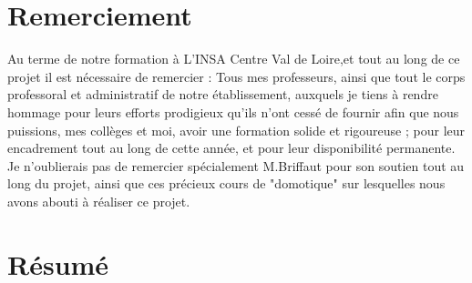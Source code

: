 \newpage
\section*{Remerciement}
Au terme de notre formation à L’INSA Centre Val de Loire,et tout au long de ce projet il est nécessaire de remercier :\newline
Tous mes professeurs, ainsi que tout le corps professoral et administratif de notre établissement, auxquels je tiens à rendre hommage pour leurs efforts prodigieux qu’ils n’ont cessé de fournir afin que nous puissions, mes collèges et moi, avoir une formation solide et rigoureuse ; pour leur encadrement tout au long de cette année, et pour leur disponibilité permanente. Je n’oublierais pas de remercier spécialement M.Briffaut pour son soutien tout au long du projet, ainsi que ces précieux cours de "domotique" sur lesquelles nous avons abouti à réaliser ce projet.\newline
\clearpage
\section*{Résumé}

\newpage
\tableofcontents
\clearpage


